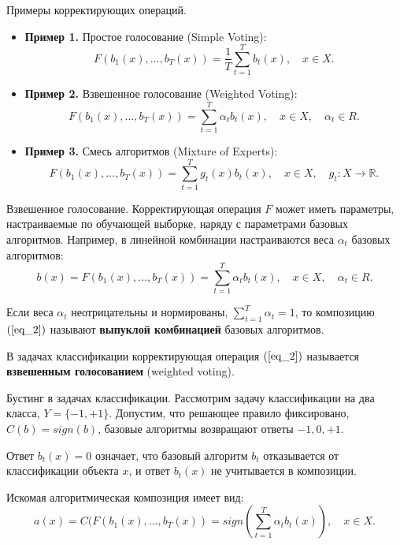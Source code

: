 \documentclass[10pt,unicode,notheorems]{beamer}
\begin{document}
\begin{frame}{Примеры корректирующих операций.}
\begin{itemize}
    \item \textbf{Пример 1.} Простое голосование (Simple Voting):
$$F(b_1(x), \ldots , b_T(x))= \frac{1}{T} \sum_{t=1}^{T} b_t(x), \quad x \in X.$$

 \item \textbf{Пример 2.}  Взвешенное голосование (Weighted Voting):
$$F(b_1(x), \ldots , b_T(x))= \sum_{t=1}^{T} \alpha_t b_t(x), \quad x \in X, \quad \alpha_t \in R.$$

 \item \textbf{Пример 3.}  Смесь алгоритмов (Mixture of Experts):
$$F(b_1(x), \ldots , b_T(x))= \sum_{t=1}^{T} g_t(x)b_t(x), \quad x \in X, \quad g_t: X \to  \mathbb R.$$  
\end{itemize}
\end{frame}


\begin{frame}{Взвешенное голосование.}
Корректирующая операция $F$ может иметь параметры, настраиваемые по обучающей выборке, наряду с параметрами базовых алгоритмов.
Например, в линейной комбинации настраиваются веса $\alpha_t$ базовых алгоритмов: 
\begin{equation}\label{eq_2}
    b(x) = F(b_1(x), \ldots , b_T(x))= \sum_{t=1}^{T} \alpha_t b_t(x), \quad x \in X, \quad \alpha_t \in R.   
\end{equation}

Если веса $\alpha_t$ неотрицательны и нормированы, $\sum_{t=1}^{T} \alpha_t = 1$, то композицию $(\ref{eq_2})$ называют \textbf{выпуклой комбинацией} базовых алгоритмов. 
\vspace{0.2cm}

В задачах классификации корректирующая операция $(\ref{eq_2})$ называется \textbf{взвешенным голосованием} (weighted voting).
\end{frame}


\begin{frame}{Бустинг в задачах классификации.}
Рассмотрим задачу классификации на два класса, $Y = \{−1, +1\}$. Допустим, что решающее правило фиксировано, $C(b) = sign(b)$, базовые алгоритмы возвращают ответы $-1, 0, +1$. 
\vspace{0.2cm}

Ответ $b_t(x) = 0$ означает, что базовый алгоритм $b_t$ отказывается от классификации объекта $x$, и ответ $b_t(x)$ не учитывается в композиции.
\vspace{0.2cm}

Искомая алгоритмическая композиция имеет вид:
\begin{equation}\label{eq_3}
    a(x) = C(F(b_1(x), \ldots , b_T (x)) = sign \left(\sum_{t=1}^{T} \alpha_t b_t(x) \right), \quad x \in X.
\end{equation}

\end{frame}
\end{document}
